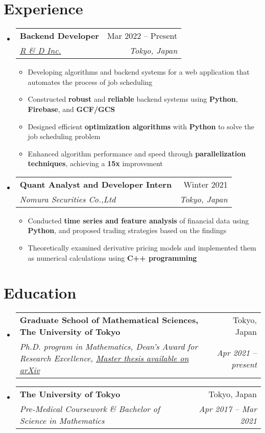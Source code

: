 \documentclass[a4paper,11pt]{article}
\makeatletter
\newcommand{\resumeItem}[1]{
  \item\small{#1}
}
\newcommand{\resumeItemListStart}{\begin{itemize}[rightmargin=0.11in]}
\newcommand{\resumeItemListEnd}{\end{itemize}}
\newcommand{\resumeQuadHeading}[4]{
  \item
  \begin{tabular*}{0.96\textwidth}[t]{l@{\extracolsep{\fill}}r}
    \textbf{#1} & #2 \\
    \textit{\small#3} & \textit{\small #4} \\
  \end{tabular*}
}
\newcommand{\resumeHeadingListStart}{
  \begin{itemize}[leftmargin=0.15in, label={}]
}
\newcommand{\resumeHeadingListEnd}{\end{itemize}}
\makeatother
\begin{document}

\section{Experience}
\resumeHeadingListStart{}
\resumeQuadHeading{Backend Developer}{Mar 2022 -- Present}
{\href{https://randd-inc.com/}{\uline{R \& D Inc.}}}{Tokyo, Japan}
\resumeItemListStart{}
\resumeItem{Developing algorithms and backend systems for a web application that automates the process of job scheduling}
\resumeItem{Constructed \textbf{robust} and \textbf{reliable} backend systems using \textbf{Python}, \textbf{Firebase}, and \textbf{GCF/GCS}}
\resumeItem{Designed efficient \textbf{optimization algorithms} with \textbf{Python} to solve the job scheduling problem}
\resumeItem{Enhanced algorithm performance and speed through \textbf{parallelization techniques}, achieving a \textbf{15x} improvement}
\resumeItemListEnd{}

\resumeQuadHeading{Quant Analyst and Developer Intern}{Winter 2021}
{Nomura Securities Co.,Ltd}{Tokyo, Japan}
\resumeItemListStart{}
\resumeItem{Conducted \textbf{time series and feature analysis} of financial data using \textbf{Python}, and proposed trading strategies based on the findings}
\resumeItem{Theoretically examined derivative pricing models and implemented them as numerical calculations using \textbf{C++ programming}}
\resumeItemListEnd{}

\resumeHeadingListEnd{}



\section{Education}
\resumeHeadingListStart{}
\resumeQuadHeading{Graduate School of Mathematical Sciences,
  The University of Tokyo}{Tokyo, Japan}
{Ph.D. program in Mathematics, Dean's Award for Research Excellence, \href{https://arxiv.org/abs/2302.12501}{\uline{Master thesis available on arXiv}}}{Apr 2021 -- present}
\resumeQuadHeading{The University of Tokyo}{Tokyo, Japan}
{Pre-Medical Coursework \& Bachelor of Science in Mathematics}{Apr 2017 -- Mar 2021}
\resumeHeadingListEnd{}
\end{document}
